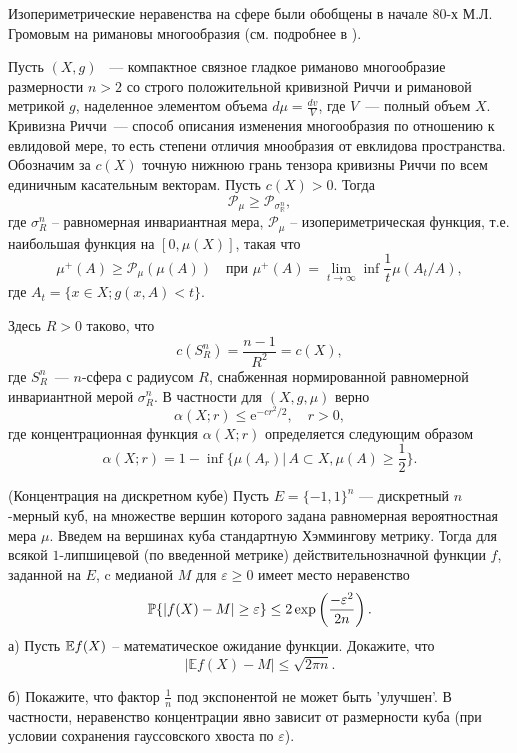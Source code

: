 \begin{remark}
Изопериметрические неравенства на сфере были обобщены в начале 80-х М.Л. Громовым на римановы многообразия (см. подробнее в \cite{14}).

Пусть $(X,g)$ ~--- компактное связное гладкое риманово многообразие размерности $n>2$ со строго положительной кривизной Риччи и римановой метрикой $g$, наделенное элементом объема $d\mu=\frac{dv}{V}$, где $V$~--- полный объем $X$. 
Кривизна Риччи~--- способ описания изменения многообразия по отношению к евлидовой мере, то есть степени отличия мнообразия  от евклидова пространства. 
Обозначим за $c(X)$ точную нижнюю грань тензора кривизны Риччи по всем единичным касательным векторам. Пусть $c(X)>0$. Тогда 
$$
\mathcal{P}_{\mu}\geq \mathcal{P}_{\sigma^n_{\mathbb{R}}},
$$
где $\sigma^n_{R}$ -- равномерная инвариантная мера, $\mathcal{P}_{\mu}$ -- изопериметрическая функция, т.е. наибольшая функция на $[0,\mu(X)]$, такая что
$$
\mu^{+}(A) \geq \mathcal{P}_{\mu}(\mu(A)) \quad \text{при~}\mu^{+}(A) = \lim_{t\to\infty}\inf\frac{1}{t}\mu(A_t/A),
$$ 
где $A_t = \{x\in X; g(x,A)<t\}$.

Здесь $R>0$ таково, что 
$$
c({S}^n_{R}) = \frac{n-1}{R^2}=c(X),
$$ 
где ${S}^n_{R}$~--- $n$-сфера с радиусом $R$, снабженная нормированной равномерной инвариантной мерой $\sigma^n_{R}$. 
В частности для $(X,g,\mu)$ верно 
\begin{equation*}
\alpha(X;r)\leq \text{e}^{-cr^2/2},\quad r>0, 
\end{equation*}
где концентрационная функция $\alpha(X;r)$ определяется следующим образом
\begin{equation*}
\alpha(X;r) = 1-\inf\biggl\{\mu(A_{r})|\, A \subset X, \mu(A)\geq \frac{1}{2}\biggr\}.
\end{equation*}
\end{remark}

\begin{problem}(Концентрация на дискретном кубе) Пусть $E = \{-1, 1\}^{n}$ --- дискретный $n$-мерный куб, на множестве вершин которого задана равномерная вероятностная мера $\mu$. Введем на вершинах куба стандартную Хэммингову метрику. Тогда для всякой $1$-липшицевой (по введенной метрике) действительнозначной функции $f$, заданной на $E$, c медианой $M$ для $\varepsilon \ge 0$ имеет место неравенство
\[
\mathrm{{\mathbb P}}\{\left|f(X) - M\right| \ge \varepsilon\} \le 2\exp\left(\frac{-\varepsilon^{2}}{2n}\right).
\]
а) Пусть $\mathrm{{\mathbb E}} f(X)$ -- математическое ожидание функции. Докажите, что
\[
\left|\mathbb{E} f(X) - M\right| \le \sqrt{2\pi n}.
\]

б) Покажите, что фактор $\frac{1}{n}$ под экспонентой не может быть 'улучшен'. В частности, неравенство концентрации явно зависит от размерности куба (при условии сохранения гауссовского хвоста по $\varepsilon$).
\end{problem}

